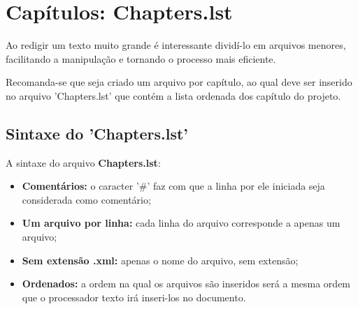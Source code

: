 \newpage \chapter{Capítulos: Chapters.lst}\setcounter{SteP}{1}

    Ao redigir um texto muito grande é interessante dividí-lo em arquivos menores, facilitando a manipulação e tornando o processo mais eficiente.

    Recomanda-se que seja criado um arquivo por capítulo, ao qual deve ser inserido no arquivo 'Chapters.lst' que contém a lista ordenada dos capítulo do projeto.

\section{Sintaxe do 'Chapters.lst'}\setcounter{SteP}{1}

    A sintaxe do arquivo {\bf Chapters.lst}:

\begin{itemize}
  \item{\bf Comentários:} o caracter '\#' faz com que a linha por ele iniciada seja considerada como comentário;
  \item{\bf Um arquivo por linha:} cada linha do arquivo corresponde a apenas um arquivo;
  \item{\bf Sem extensão .xml:} apenas o nome do arquivo, sem extensão;
  \item{\bf Ordenados:} a ordem na qual os arquivos são inseridos será a mesma ordem que o processador texto irá inseri-los no documento.
\end{itemize}

